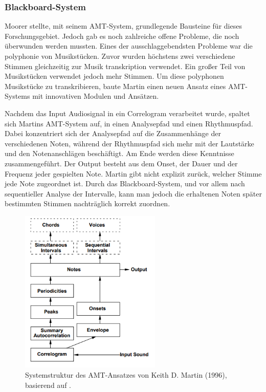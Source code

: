 \subsubsection{Blackboard-System}
Moorer stellte, mit seinem AMT-System, grundlegende Bausteine für dieses Forschungsgebiet.
Jedoch gab es noch zahlreiche offene Probleme, die noch überwunden werden mussten.
Eines der ausschlaggebendsten Probleme war die polyphonie von Musikstücken.
\cite{Martin1996}
Zuvor wurden höchstens zwei verschiedene Stimmen gleichzeitig zur Musik transkription verwendet.
Ein großer Teil von Musikstücken verwendet jedoch mehr Stimmen.
Um diese polyphonen Musikstücke zu transkribieren,
baute Martin einen neuen Ansatz eines AMT-Systems mit innovativen Modulen und Ansätzen.

Nachdem das Input Audiosignal in ein Correlogram verarbeitet wurde,
spaltet sich Martins AMT-System auf, in einen Analysepfad und einen Rhythmuspfad.
Dabei konzentriert sich der Analysepfad auf die Zusammenhänge der verschiedenen Noten,
während der Rhythmuspfad sich mehr mit der Lautstärke und den Notenanschlägen beschäftigt.
Am Ende werden diese Kenntnisse zusammengeführt.
Der Output besteht aus dem Onset, der Dauer und der Frequenz jeder gespielten Note.
Martin gibt nicht explizit zurück, welcher Stimme jede Note zugeordnet ist.
Durch das Blackboard-System, und vor allem nach sequentieller Analyse der Intervalle, kann man
jedoch die erhaltenen Noten später bestimmten Stimmen nachträglich korrekt zuordnen.

\begin{figure}[H]
    \centering
    \includegraphics[width=0.6\textwidth]{Graphics/Martin1996Structure}
    \caption[Systemstruktur nach Martin]{Systemstruktur des AMT-Ansatzes von Keith D. Martin (1996), basierend auf \cite{Martin1996}.}
    \label{fig:martin-structure}
\end{figure}

